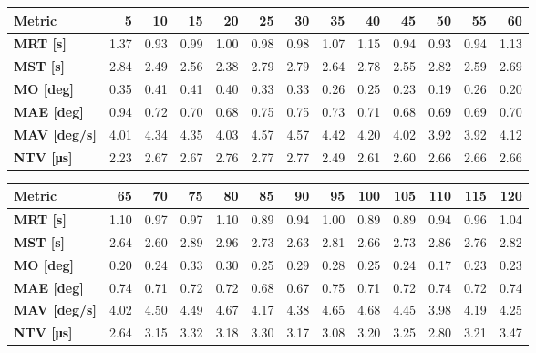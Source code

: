 \begin{tabular*}{\textwidth}{@{\extracolsep{\fill}}l|rrrrrrrrrrrr}
    \toprule
    \textbf{Metric} & \textbf{5} & \textbf{10} & \textbf{15} & \textbf{20} & \textbf{25} & \textbf{30} & \textbf{35} & \textbf{40} & \textbf{45} & \textbf{50} & \textbf{55} & \textbf{60} \\
    \midrule
    \textbf{MRT [s]} & 1.37 & 0.93 & 0.99 & 1.00 & 0.98 & 0.98 & 1.07 & 1.15 & 0.94 & 0.93 & 0.94 & 1.13 \\
    \textbf{MST [s]} & 2.84 & 2.49 & 2.56 & 2.38 & 2.79 & 2.79 & 2.64 & 2.78 & 2.55 & 2.82 & 2.59 & 2.69 \\
    \textbf{MO  [deg]} & 0.35 & 0.41 & 0.41 & 0.40 & 0.33 & 0.33 & 0.26 & 0.25 & 0.23 & 0.19 & 0.26 & 0.20 \\
    \textbf{MAE [deg]} & 0.94 & 0.72 & 0.70 & 0.68 & 0.75 & 0.75 & 0.73 & 0.71 & 0.68 & 0.69 & 0.69 & 0.70 \\
    \textbf{MAV [deg/s]} & 4.01 & 4.34 & 4.35 & 4.03 & 4.57 & 4.57 & 4.42 & 4.20 & 4.02 & 3.92 & 3.92 & 4.12 \\
    \textbf{NTV [\si{\micro\second}]} & 2.23 & 2.67 & 2.67 & 2.76 & 2.77 & 2.77 & 2.49 & 2.61 & 2.60 & 2.66 & 2.66 & 2.66 \\
    \bottomrule
\end{tabular*}

\begin{tabular*}{\textwidth}{@{\extracolsep{\fill}}l|rrrrrrrrrrrr}
    \toprule
    \textbf{Metric} & \textbf{65} & \textbf{70} & \textbf{75} & \textbf{80} & \textbf{85} & \textbf{90} & \textbf{95} & \textbf{100} & \textbf{105} & \textbf{110} & \textbf{115} & \textbf{120} \\
    \midrule
    \textbf{MRT [s]} & 1.10 & 0.97 & 0.97 & 1.10 & 0.89 & 0.94 & 1.00 & 0.89 & 0.89 & 0.94 & 0.96 & 1.04 \\
    \textbf{MST [s]} & 2.64 & 2.60 & 2.89 & 2.96 & 2.73 & 2.63 & 2.81 & 2.66 & 2.73 & 2.86 & 2.76 & 2.82 \\
    \textbf{MO  [deg]} & 0.20 & 0.24 & 0.33 & 0.30 & 0.25 & 0.29 & 0.28 & 0.25 & 0.24 & 0.17 & 0.23 & 0.23 \\
    \textbf{MAE [deg]} & 0.74 & 0.71 & 0.72 & 0.72 & 0.68 & 0.67 & 0.75 & 0.71 & 0.72 & 0.74 & 0.72 & 0.74 \\
    \textbf{MAV [deg/s]} & 4.02 & 4.50 & 4.49 & 4.67 & 4.17 & 4.38 & 4.65 & 4.68 & 4.45 & 3.98 & 4.19 & 4.25 \\
    \textbf{NTV [\si{\micro\second}]} & 2.64 & 3.15 & 3.32 & 3.18 & 3.30 & 3.17 & 3.08 & 3.20 & 3.25 & 2.80 & 3.21 & 3.47 \\
    \bottomrule
\end{tabular*}

